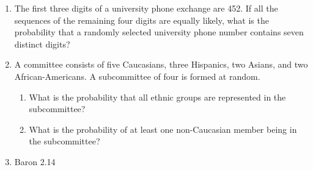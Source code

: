 \begin{enumerate}
  \item The first three digits of a university phone exchange are 452. If all the sequences of the remaining four digits are equally likely, what is the probability that a randomly selected university phone number contains seven distinct digits? 
	
    
	\item A committee consists of five Caucasians, three Hispanics, two Asians, and two African-Americans.
A subcommittee of four is formed at random. 
		\begin{enumerate}
		\item What is the probability that all ethnic groups are represented in the subcommittee? 
		\item What is the probability of at least one non-Caucasian member being in the subcommittee? 
		\end{enumerate}
		
			
    
    
\item Baron 2.14

\end{enumerate}
